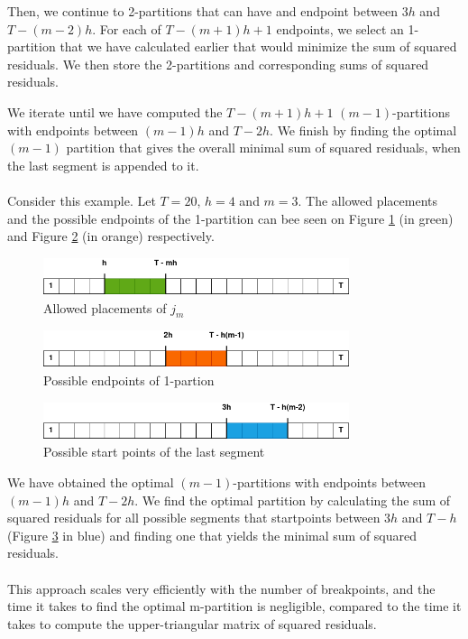 \documentclass[main.tex]{subfiles}
\begin{document}
Then, we continue to 2-partitions that can have and endpoint between $3h$ and
$T - (m-2)h$. For each of $T - (m + 1)h + 1$ endpoints, we select an
1-partition that we have calculated earlier that would minimize the sum of
squared residuals. We then store the 2-partitions and corresponding sums of
squared residuals.

We iterate until we have computed the $T - (m + 1)h + 1$
$(m-1)$-partitions with endpoints between $(m-1)h$ and $T-2h$.
We finish by finding the optimal $(m-1)$ partition that gives the overall
minimal sum of squared residuals, when the last segment is appended to it.\\\\
Consider this example. Let $T=20$, $h=4$ and $m=3$. The allowed placements
and the possible endpoints of the 1-partition can bee seen on Figure \ref{plt_4_1} (in
green) and Figure \ref{plt_4_2} (in orange) respectively. 

\begin{figure}[H]
  \centering
  \includegraphics[width=0.8\textwidth]{imgs/breakpoints1}
  \caption{Allowed placements of $j_m$}
  \label{plt_4_1}
\end{figure}

\begin{figure}[H]
  \centering
  \includegraphics[width=0.8\textwidth]{imgs/breakpoints2}
  \caption{Possible endpoints of 1-partion}
  \label{plt_4_2}
\end{figure}

\begin{figure}[H]
  \centering
  \includegraphics[width=0.8\textwidth]{imgs/breakpoints3}
  \caption{Possible start points of the last segment}
  \label{plt_4_3}
\end{figure}
We have obtained the optimal $(m - 1)$-partitions with endpoints between
$(m - 1)h$
and $T - 2h$. We find the optimal partition by calculating the sum of squared
residuals for all possible segments that startpoints between $3h$ and $T - h$
(Figure \ref{plt_4_3} in blue) and finding one that yields the minimal sum of
squared residuals.\\\\
This approach scales very efficiently with the number of breakpoints,
and the time it takes to find the optimal m-partition is negligible, compared to
the time it takes to compute the upper-triangular matrix of squared residuals.
\end{document}
